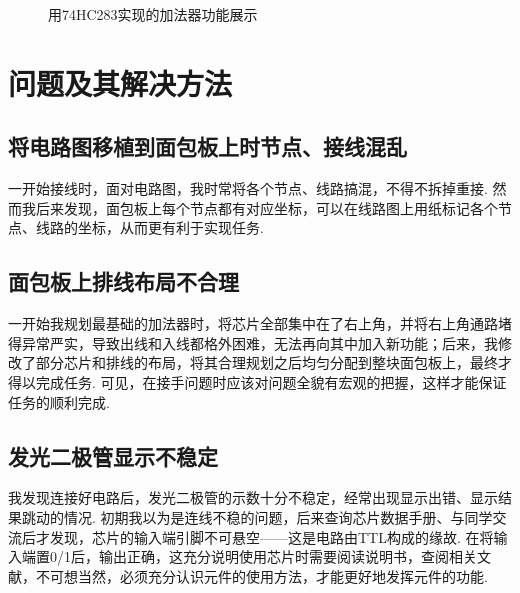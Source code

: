 \documentclass[UTF8]{ctexart}
\begin{document}
{\begin{figure}[H]
{    \hspace{0.3mm}
    \caption{用74HC283实现的加法器功能展示}
    \restoregeometry
    }
\end{figure}\par

\section{问题及其解决方法}

\subsection{将电路图移植到面包板上时节点、接线混乱}
一开始接线时，面对电路图，我时常将各个节点、线路搞混，不得不拆掉重接. 然而我后来发现，面包板上每个节点都有对应坐标，可以在线路图上用纸标记各个节点、线路的坐标，从而更有利于实现任务.

\subsection{面包板上排线布局不合理}
一开始我规划最基础的加法器时，将芯片全部集中在了右上角，并将右上角通路堵得异常严实，导致出线和入线都格外困难，无法再向其中加入新功能；后来，我修改了部分芯片和排线的布局，将其合理规划之后均匀分配到整块面包板上，最终才得以完成任务. 可见，在接手问题时应该对问题全貌有宏观的把握，这样才能保证任务的顺利完成.

\subsection{发光二极管显示不稳定}
我发现连接好电路后，发光二极管的示数十分不稳定，经常出现显示出错、显示结果跳动的情况. 初期我以为是连线不稳的问题，后来查询芯片数据手册、与同学交流后才发现，芯片的输入端引脚不可悬空——这是电路由TTL构成的缘故. 在将输入端置0/1后，输出正确，这充分说明使用芯片时需要阅读说明书，查阅相关文献，不可想当然，必须充分认识元件的使用方法，才能更好地发挥元件的功能.

}
\end{document}
